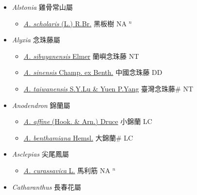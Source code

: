 
  \begin{itemize}
 \item[] \textit{Alstonia} 雞骨常山屬
                    
  \begin{itemize}
        \item[] \href{http://www.theplantlist.org/tpl1.1/search?q=Alstonia+scholaris}{\textit{A. scholaris} (L.) R.Br.}   黑板樹 NA $^n$
  \end{itemize}
 \item[] \textit{Alyxia} 念珠藤屬
                    
  \begin{itemize}
        \item[] \href{http://www.theplantlist.org/tpl1.1/search?q=Alyxia+sibuyanensis}{\textit{A. sibuyanensis} Elmer}   蘭嶼念珠藤 NT
        \item[] \href{http://www.theplantlist.org/tpl1.1/search?q=Alyxia+sinensis}{\textit{A. sinensis} Champ. ex Benth.}   中國念珠藤 DD
        \item[] \href{http://www.theplantlist.org/tpl1.1/search?q=Alyxia+taiwanensis}{\textit{A. taiwanensis} S.Y.Lu \& Yuen P.Yang}   臺灣念珠藤\# NT
  \end{itemize}
 \item[] \textit{Anodendron} 錦蘭屬
                    
  \begin{itemize}
        \item[] \href{http://www.theplantlist.org/tpl1.1/search?q=Anodendron+affine}{\textit{A. affine} (Hook. \& Arn.) Druce}   小錦蘭 LC
        \item[] \href{http://www.theplantlist.org/tpl1.1/search?q=Anodendron+benthamiana}{\textit{A. benthamiana} Hemsl.}   大錦蘭\# LC
  \end{itemize}
 \item[] \textit{Asclepias} 尖尾鳳屬
                    
  \begin{itemize}
        \item[] \href{http://www.theplantlist.org/tpl1.1/search?q=Asclepias+curassavica}{\textit{A. curassavica} L.}   馬利筋 NA $^n$
  \end{itemize}
 \item[] \textit{Catharanthus} 長春花屬
                    

\end{itemize}
